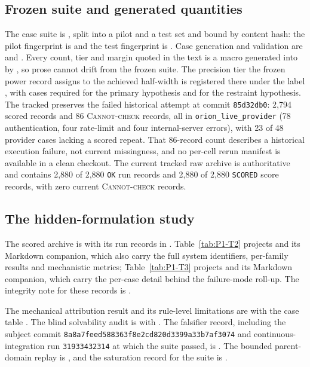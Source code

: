 \subsection{Frozen suite and generated quantities}
The case suite is , split into a pilot and a test set and
bound by content hash: the pilot fingerprint is
\texttt{\PilotSuiteFingerprintShort} and the test fingerprint is
\texttt{\TestSuiteFingerprintShort}. Case generation and validation are
 and
. Every count, tier and margin quoted in
the text is a macro generated into 
by , so prose cannot drift from the frozen
suite. The precision tier the frozen power record assigns to the achieved
half-width is registered there under the label \texttt{\AchievedTier}, with
\RequiredNForHOne{} cases required for the primary hypothesis and
\RequiredNForHTwo{} for the restraint hypothesis. The tracked
 preserves the failed historical attempt at
commit \texttt{85d32db0}: 2,794 scored records and 86
\textsc{Cannot-check} records, all in \texttt{orion\_live\_provider} (78
authentication, four rate-limit and four internal-server errors), with 23 of
48 provider cases lacking a scored repeat. That 86-record count describes a
historical execution failure, not current missingness, and no per-cell rerun
manifest is available in a clean checkout. The current tracked raw archive is
authoritative and contains 2,880 of 2,880 \texttt{OK} run records and 2,880 of
2,880 \texttt{SCORED} score records, with zero current
\textsc{Cannot-check} records.

\subsection{The hidden-formulation study}
The scored archive is  with its run records
in . Table~\ref{tab:P1-T2} projects
 and its Markdown companion,
which also carry the full system identifiers, per-family results and mechanistic
metrics; Table~\ref{tab:P1-T3} projects
 and its Markdown companion, which
carry the per-case detail behind the failure-mode roll-up. The integrity note
for these records is .

The mechanical attribution result and its rule-level limitations are
 with the case table
. The blind solvability audit is
 with
. The falsifier record,
including the subject commit \texttt{8a8a7feed588363f8e2cd820d3399a33b7af3074}
and continuous-integration run \texttt{31933432314} at which the suite passed,
is . The bounded parent-domain replay is
, and the saturation record for the
suite is .

